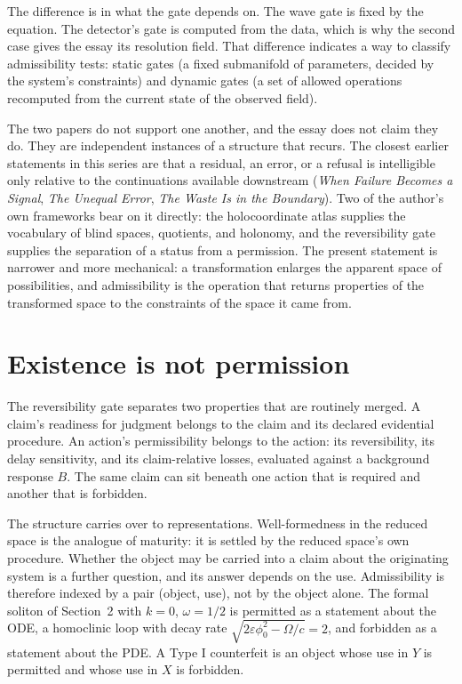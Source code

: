 \documentclass[11pt]{article}
\theoremstyle{definition}
\theoremstyle{remark}
\begin{document}
The difference is in what the gate depends on. The wave gate is fixed by the equation. The detector's gate is computed from the data, which is why the second case gives the essay its resolution field. That difference indicates a way to classify admissibility tests: static gates (a fixed submanifold of parameters, decided by the system's constraints) and dynamic gates (a set of allowed operations recomputed from the current state of the observed field).

The two papers do not support one another, and the essay does not claim they do. They are independent instances of a structure that recurs. The closest earlier statements in this series are that a residual, an error, or a refusal is intelligible only relative to the continuations available downstream (\emph{When Failure Becomes a Signal}, \emph{The Unequal Error}, \emph{The Waste Is in the Boundary}). Two of the author's own frameworks bear on it directly: the holocoordinate atlas supplies the vocabulary of blind spaces, quotients, and holonomy, and the reversibility gate supplies the separation of a status from a permission. The present statement is narrower and more mechanical: a transformation enlarges the apparent space of possibilities, and admissibility is the operation that returns properties of the transformed space to the constraints of the space it came from.

\section{Existence is not permission}

The reversibility gate \cite{revgate} separates two properties that are routinely merged. A claim's readiness for judgment belongs to the claim and its declared evidential procedure. An action's permissibility belongs to the action: its reversibility, its delay sensitivity, and its claim-relative losses, evaluated against a background response $B$. The same claim can sit beneath one action that is required and another that is forbidden.

The structure carries over to representations. Well-formedness in the reduced space is the analogue of maturity: it is settled by the reduced space's own procedure. Whether the object may be carried into a claim about the originating system is a further question, and its answer depends on the use. Admissibility is therefore indexed by a pair (object, use), not by the object alone. The formal soliton of Section~2 with $k=0$, $\omega=1/2$ is permitted as a statement about the ODE, a homoclinic loop with decay rate $\sqrt{2\varepsilon\phi_0^2-\Omega/c}=2$, and forbidden as a statement about the PDE. A Type I counterfeit is an object whose use in $Y$ is permitted and whose use in $X$ is forbidden.
\end{document}
